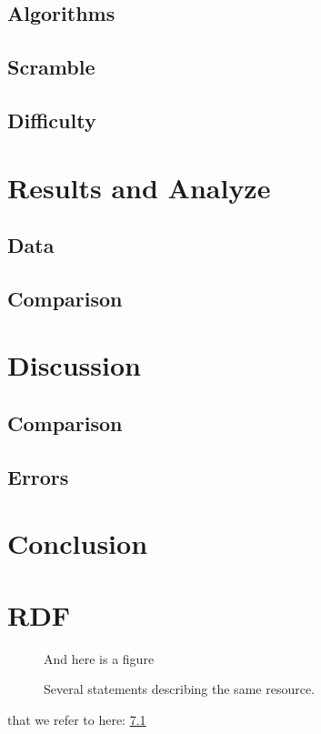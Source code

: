 \documentclass[a4paper,11pt]{kth-mag}
\begin{document}
\section{Algorithms}
\section{Scramble}
\section{Difficulty}

\chapter{Results and Analyze}

\section{Data}
\section{Comparison}

\chapter{Discussion}

\section{Comparison}
\section{Errors}

\chapter{Conclusion}
\cite{MadeHow}
\renewcommand{\bibname}{References}



\appendix
\addappheadtotoc
\chapter{RDF}\label{appA}

\begin{figure}[ht]
\begin{center}
And here is a figure
\caption{\small{Several statements describing the same resource.}}\label{RDF_4}
\end{center}
\end{figure}

that we refer to here: \ref{RDF_4}
\end{document}
